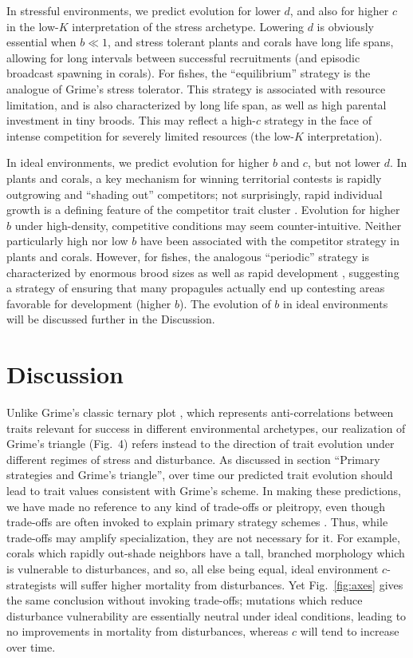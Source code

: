\documentclass[11pt]{article}
\begin{document}
In stressful environments, we predict evolution for lower $d$, and also  for higher $c$ in the low-$K$ interpretation of the stress archetype. Lowering $d$ is obviously essential when $b\ll 1$, and stress tolerant plants and corals have long life spans, allowing for long intervals between successful recruitments (and episodic broadcast spawning in corals). For fishes, the ``equilibrium'' strategy is the analogue of Grime's stress tolerator. This strategy is associated with resource limitation, and is also characterized by long life span, as well as high parental investment in tiny broods. This may reflect a high-$c$ strategy in the face of intense competition for severely limited resources (the low-$K$ interpretation).

In ideal environments, we predict evolution for higher $b$ and $c$, but not lower $d$. In plants and corals, a key mechanism for winning territorial contests is rapidly outgrowing and ``shading out'' competitors; not surprisingly, rapid individual growth is a defining feature of the competitor trait cluster \citep{grime_1977,darling_2012}. Evolution for higher $b$ under high-density, competitive conditions may seem counter-intuitive. Neither particularly high nor low $b$ have been associated with the competitor strategy in plants and corals. However, for fishes, the analogous ``periodic'' strategy is characterized by enormous brood sizes as well as rapid development \citep{winemiller_1992,winemiller_2015}, suggesting a strategy of ensuring that many propagules actually end up contesting areas favorable for development (higher $b$). The evolution of $b$ in ideal environments will be discussed further in the Discussion.

\section*{Discussion}

Unlike Grime's classic ternary plot \citep{grime_1974}, which represents anti-correlations between traits relevant for success in different environmental archetypes, our realization of Grime's triangle (Fig.~4) refers instead to the direction of trait evolution under different regimes of stress and disturbance. As discussed in section ``Primary strategies and Grime's triangle'', over time our predicted trait evolution should lead to trait values consistent with Grime's scheme. In making these predictions, we have made no reference to any kind of trade-offs or pleitropy, even though trade-offs are often invoked to explain primary strategy schemes \citep{macarthur_1962,winemiller_1992,aerts_1999}. Thus, while trade-offs may amplify specialization, they are not necessary for it. For example, corals which rapidly out-shade neighbors have a tall, branched morphology which is vulnerable to disturbances, and so, all else being equal, ideal environment $c$-strategists will suffer higher mortality from disturbances. Yet Fig.~\ref{fig:axes} gives the same conclusion without invoking trade-offs; mutations which reduce disturbance vulnerability are essentially neutral under ideal conditions, leading to no improvements in mortality from disturbances, whereas $c$ will tend to increase over time. 
\end{document}
